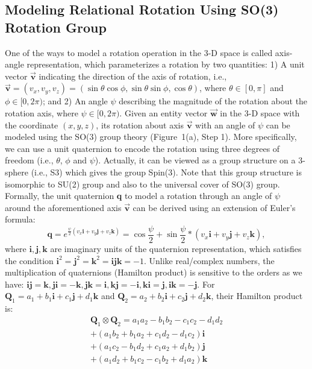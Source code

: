 \documentclass[11pt]{article}
\begin{document}
\subsection{Modeling Relational Rotation Using SO(3) Rotation Group}

One of the ways to model a rotation operation in the 3-D space is called axis-angle representation, which parameterizes a rotation by two quantities: 1) A unit vector \(\overrightarrow{\boldsymbol{v}}\) indicating the direction of the axis of rotation, i.e.,  \(\overrightarrow{\boldsymbol{v}} = (v_x, v_y, v_z) = (\sin{\theta}\cos{\phi}, \sin{\theta}\sin{\phi}, \cos{\theta})\), where \(\theta \in [0, \pi]\) and \(\phi \in [0, 2\pi)\); and  2) An angle \(\psi\) describing the magnitude of the rotation about the rotation axis, where \(\psi \in [0, 2\pi)\). Given an entity vector \(\overrightarrow{\boldsymbol{w}}\) in the 3-D space with the coordinate \((x, y, z)\), its rotation about axis \(\overrightarrow{\boldsymbol{v}}\) with an angle of \(\psi\) can be modeled using the SO(3) group theory (Figure~1(a), Step 1). More specifically, we can use a unit quaternion to encode the rotation using three degrees of freedom (i.e., \(\theta\), \(\phi\) and \(\psi\)). Actually, it can be viewed as a group structure on a 3-sphere (i.e., S3) which gives the group Spin(3). Note that this group structure is isomorphic to SU(2) group and also to the universal cover of SO(3) group. Formally, the unit quaternion \textbf{q} to model a rotation through an angle of \(\psi\) around the aforementioned axis \(\overrightarrow{\boldsymbol{v}}\) can be derived using an extension of Euler's formula:
\begin{equation}
\textbf{q} = e^{\frac{\psi}{2}(v_x\textbf{i} + v_y\textbf{j} + v_z\textbf{k})} = \cos{\frac{\psi}{2}} + \sin{\frac{\psi}{2}} * (v_x\textbf{i} + v_y\textbf{j} + v_z\textbf{k}),
\label{unit_quat_def}
\end{equation}
\noindent where \(\textbf{i}, \textbf{j}, \textbf{k}\) are imaginary units of the quaternion representation, which satisfies the condition \(\textbf{i}^2 = \textbf{j}^2 = \textbf{k}^2 = \textbf{ijk} = -1\).
Unlike real/complex numbers, the multiplication of quaternions (Hamilton product) is sensitive to the orders as we have: \(\textbf{ij}=\textbf{k}, \textbf{ji}=-\textbf{k}, \textbf{jk}=\textbf{i}, \textbf{kj}=-\textbf{i}, \textbf{ki}=\textbf{j}, \textbf{ik}=-\textbf{j}\).
For \(\textbf{Q}_1 = a_1 + b_1\textbf{i} + c_1\textbf{j} + d_1\textbf{k}\) and \(\textbf{Q}_2 = a_2 + b_2\textbf{i} + c_2\textbf{j} + d_2\textbf{k}\), their Hamilton product is:
\begin{equation}
\begin{aligned}
\textbf{Q}_1 \otimes \textbf{Q}_2 = a_1a_2 - b_1b_2 - c_1c_2 - d_1d_2 \\ + (a_1b_2 + b_1a_2 + c_1d_2 - d_1c_2)\textbf{i} \\
+ (a_1c_2 - b_1d_2 + c_1a_2 + d_1b_2)\textbf{j} \\
+ (a_1d_2 + b_1c_2 - c_1b_2 + d_1a_2)\textbf{k}
\label{quat_prod}
\end{aligned}
\end{equation}
\end{document}
